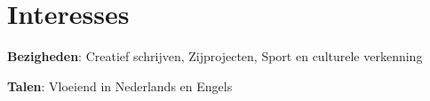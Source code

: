\section{Interesses}
 \resumeSubHeadingListStart
   \item{
     \textbf{Bezigheden}{: Creatief schrijven, Zijprojecten, Sport en culturele verkenning}
   }
   \item{
     \textbf{Talen}{: Vloeiend in Nederlands en Engels}
   }
 \resumeSubHeadingListEnd
